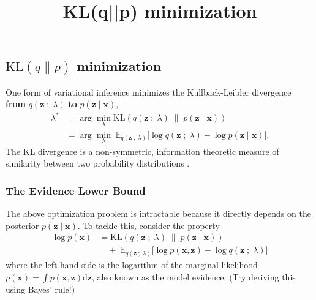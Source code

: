 \title{KL(q||p) minimization}

\subsection{$\text{KL}(q\|p)$ minimization}

One form of variational inference minimizes the Kullback-Leibler
divergence \textbf{from} $q(\mathbf{z}\;;\;\lambda)$ \textbf{to}
$p(\mathbf{z} \mid \mathbf{x})$,
\begin{align*}
  \lambda^*
  &=
  \arg\min_\lambda \text{KL}(
  q(\mathbf{z}\;;\;\lambda)
  \;\|\;
  p(\mathbf{z} \mid \mathbf{x})
  )\\
  &=
  \arg\min_\lambda\;
  \mathbb{E}_{q(\mathbf{z}\;;\;\lambda)}
  \big[
  \log q(\mathbf{z}\;;\;\lambda)
  -
  \log p(\mathbf{z} \mid \mathbf{x})
  \big].
\end{align*}
The KL divergence is a non-symmetric, information theoretic measure of
similarity between two probability distributions
\citep{hinton1993keeping,waterhouse1996bayesian,jordan1999introduction}.

\subsubsection{The Evidence Lower Bound}

The above optimization problem is intractable because it directly
depends on the posterior $p(\mathbf{z} \mid \mathbf{x})$. To tackle
this, consider the property
\begin{align*}
  \log p(\mathbf{x})
  &=
  \text{KL}(
  q(\mathbf{z}\;;\;\lambda)
  \;\|\;
  p(\mathbf{z} \mid \mathbf{x})
  )\\
  &\quad+\;
  \mathbb{E}_{q(\mathbf{z}\;;\;\lambda)}
  \big[
  \log p(\mathbf{x}, \mathbf{z})
  -
  \log q(\mathbf{z}\;;\;\lambda)
  \big]
\end{align*}
where the left hand side is the logarithm of the marginal likelihood
$p(\mathbf{x}) = \int p(\mathbf{x}, \mathbf{z}) \text{d}\mathbf{z}$,
also known as the model evidence. (Try deriving this using Bayes'
rule!)

